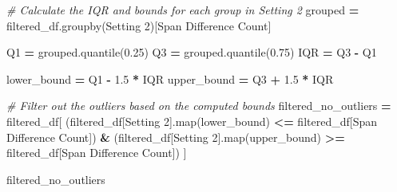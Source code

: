 \documentclass[
]{article}
\newenvironment{Shaded}{\begin{snugshade}}{\end{snugshade}}
\newcommand{\BuiltInTok}[1]{#1}
\newcommand{\CommentTok}[1]{\textcolor[rgb]{0.56,0.35,0.01}{\textit{#1}}}
\newcommand{\FloatTok}[1]{\textcolor[rgb]{0.00,0.00,0.81}{#1}}
\newcommand{\NormalTok}[1]{#1}
\newcommand{\OperatorTok}[1]{\textcolor[rgb]{0.81,0.36,0.00}{\textbf{#1}}}
\newcommand{\StringTok}[1]{\textcolor[rgb]{0.31,0.60,0.02}{#1}}
\begin{document}
\begin{Shaded}
\begin{Highlighting}[]
\CommentTok{\# Calculate the IQR and bounds for each group in \textquotesingle{}Setting 2\textquotesingle{}}
\NormalTok{grouped }\OperatorTok{=}\NormalTok{ filtered\_df.groupby(}\StringTok{\textquotesingle{}Setting 2\textquotesingle{}}\NormalTok{)[}\StringTok{\textquotesingle{}Span Difference Count\textquotesingle{}}\NormalTok{]}

\NormalTok{Q1 }\OperatorTok{=}\NormalTok{ grouped.quantile(}\FloatTok{0.25}\NormalTok{)}
\NormalTok{Q3 }\OperatorTok{=}\NormalTok{ grouped.quantile(}\FloatTok{0.75}\NormalTok{)}
\NormalTok{IQR }\OperatorTok{=}\NormalTok{ Q3 }\OperatorTok{{-}}\NormalTok{ Q1}

\NormalTok{lower\_bound }\OperatorTok{=}\NormalTok{ Q1 }\OperatorTok{{-}} \FloatTok{1.5} \OperatorTok{*}\NormalTok{ IQR}
\NormalTok{upper\_bound }\OperatorTok{=}\NormalTok{ Q3 }\OperatorTok{+} \FloatTok{1.5} \OperatorTok{*}\NormalTok{ IQR}

\CommentTok{\# Filter out the outliers based on the computed bounds}
\NormalTok{filtered\_no\_outliers }\OperatorTok{=}\NormalTok{ filtered\_df[}
\NormalTok{    (filtered\_df[}\StringTok{\textquotesingle{}Setting 2\textquotesingle{}}\NormalTok{].}\BuiltInTok{map}\NormalTok{(lower\_bound) }\OperatorTok{\textless{}=}\NormalTok{ filtered\_df[}\StringTok{\textquotesingle{}Span Difference Count\textquotesingle{}}\NormalTok{]) }\OperatorTok{\&}
\NormalTok{    (filtered\_df[}\StringTok{\textquotesingle{}Setting 2\textquotesingle{}}\NormalTok{].}\BuiltInTok{map}\NormalTok{(upper\_bound) }\OperatorTok{\textgreater{}=}\NormalTok{ filtered\_df[}\StringTok{\textquotesingle{}Span Difference Count\textquotesingle{}}\NormalTok{])}
\NormalTok{]}

\NormalTok{filtered\_no\_outliers}
\end{Highlighting}
\end{Shaded}
\end{document}
